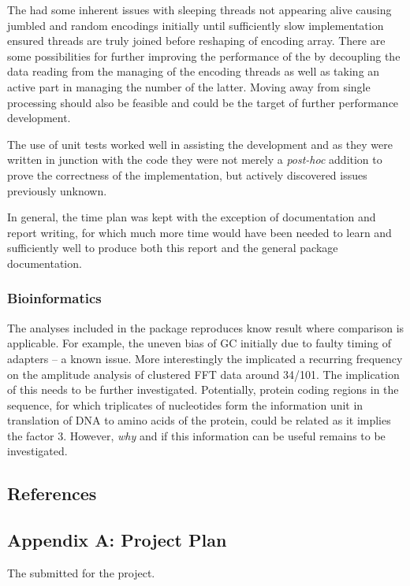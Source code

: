 \documentclass[letterpaper,10pt,english]{sphinxmanual}
\begin{document}
The  had some inherent issues with sleeping threads not appearing
alive causing jumbled and random encodings initially until sufficiently slow
implementation ensured threads are truly joined before reshaping of encoding
array.
There are some possibilities for further improving the performance of the
 by decoupling the data reading from the managing of the encoding
threads as well as taking an active part in managing the number of the latter.
Moving away from single processing should also be feasible and could be the
target of further performance development.

The use of unit tests worked well in assisting the development and as they were
written in junction with the code they were not merely a \emph{post-hoc} addition to
prove the correctness of the implementation, but actively discovered issues
previously unknown.

In general, the time plan was kept with the exception of documentation and
report writing, for which much more time would have been needed to learn
 and  sufficiently well to produce both this report
and the general package documentation.


\subsubsection{Bioinformatics}
\label{c3se_python_course:bioinformatics}
The analyses included in the package reproduces know result where comparison is
applicable.
For example, the uneven bias of GC initially due to faulty timing of adapters
-- a known issue.
More interestingly the implicated a recurring frequency on the amplitude
analysis of clustered FFT data around 34/101.
The implication of this needs to be further investigated.
Potentially, protein coding regions in the sequence, for which triplicates of
nucleotides form the information unit in translation of DNA to amino acids of
the protein, could be related as it implies the factor 3.
However, \emph{why} and if this information can be useful remains to be investigated.


\subsection{References}
\label{c3se_python_course:references}

\subsection{Appendix A: Project Plan}
\label{c3se_python_course:appendix-a-project-plan}
The  submitted for the project.
\end{document}
